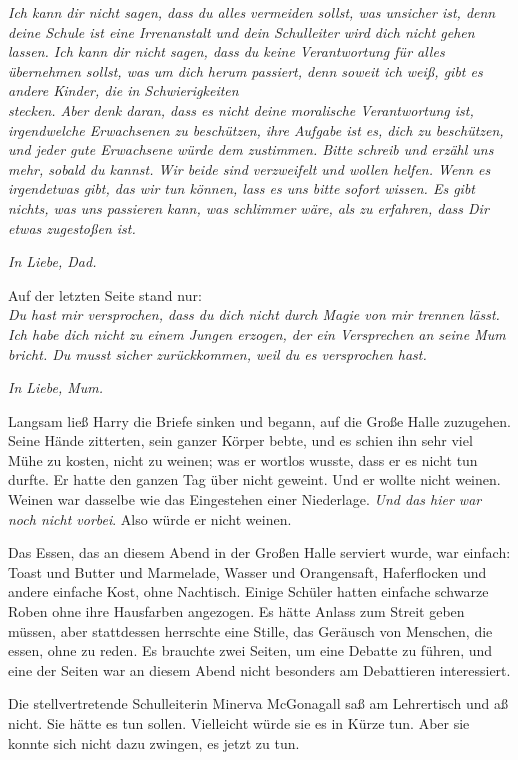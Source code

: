 {\emph{Ich kann dir nicht sagen, dass du alles vermeiden sollst, was unsicher ist, denn deine Schule ist eine Irrenanstalt und dein Schulleiter wird dich nicht gehen lassen. Ich kann dir nicht sagen, dass du keine Verantwortung für alles übernehmen sollst, was um dich herum passiert, denn soweit ich weiß, gibt es andere Kinder, die in Schwierigkeiten}\\ \emph{stecken. Aber denk daran, dass es nicht deine moralische Verantwortung ist, irgendwelche Erwachsenen zu beschützen, ihre Aufgabe ist es, dich zu beschützen, und jeder gute Erwachsene würde dem zustimmen. Bitte schreib und erzähl uns mehr, sobald du kannst. Wir beide sind verzweifelt und wollen helfen. Wenn es irgendetwas gibt, das wir tun können, lass es uns bitte sofort wissen. Es gibt nichts, was uns passieren kann, was schlimmer wäre, als zu erfahren, dass Dir etwas zugestoßen ist.}

\emph{In Liebe, Dad.}

Auf der letzten Seite stand nur:\\ \emph{Du hast mir versprochen, dass du dich nicht durch Magie von mir trennen lässt. Ich habe dich nicht zu einem Jungen erzogen, der ein Versprechen an seine Mum bricht. Du musst sicher zurückkommen, weil du es versprochen hast.}

\emph{In Liebe, Mum.}

Langsam ließ Harry die Briefe sinken und begann, auf die Große Halle zuzugehen. Seine Hände zitterten, sein ganzer Körper bebte, und es schien ihn sehr viel Mühe zu kosten, nicht zu weinen; was er wortlos wusste, dass er es nicht tun durfte. Er hatte den ganzen Tag über nicht geweint. Und er wollte nicht weinen. Weinen war dasselbe wie das Eingestehen einer Niederlage. \emph{Und das hier war noch nicht vorbei}. Also würde er nicht weinen.

Das Essen, das an diesem Abend in der Großen Halle serviert wurde, war einfach: Toast und Butter und Marmelade, Wasser und Orangensaft, Haferflocken und andere einfache Kost, ohne Nachtisch. Einige Schüler hatten einfache schwarze Roben ohne ihre Hausfarben angezogen. Es hätte Anlass zum Streit geben müssen, aber stattdessen herrschte eine Stille, das Geräusch von Menschen, die essen, ohne zu reden. Es brauchte zwei Seiten, um eine Debatte zu führen, und eine der Seiten war an diesem Abend nicht besonders am Debattieren interessiert.

Die stellvertretende Schulleiterin Minerva McGonagall saß am Lehrertisch und aß nicht. Sie hätte es tun sollen. Vielleicht würde sie es in Kürze tun. Aber sie konnte sich nicht dazu zwingen, es jetzt zu tun.

}
